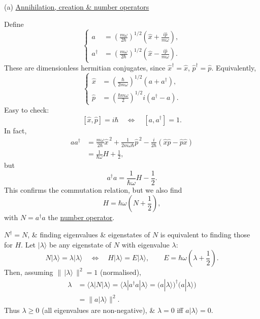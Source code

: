 \documentclass[11pt,a4paper]{article}
\begin{document}
\medskip

\noindent
(a) \underline{Annihilation, creation \& number operators}

Define
\[
    \left\{
    \begin{aligned}
        a&=\left(\frac{m\omega}{2\hbar}\right)^{1/2}
        \left(\hat{x}+\frac{i\hat{p}}{m\omega}\right),\\
        a^\dagger&=\left(\frac{m\omega}{2\hbar}\right)^{1/2}
        \left(\hat{x}-\frac{i\hat{p}}{m\omega}\right).
    \end{aligned}
    \right.
\]
These are dimensionless hermitian conjugates, since
$\hat{x}^\dagger=\hat{x}$, $\hat{p}^\dagger=\hat{p}$.
Equivalently,
\[
    \left\{
    \begin{aligned}
        \hat{x}&=\left(\frac{\hbar}{2m\omega}\right)^{1/2}
        (a+a^\dagger),\\
        \hat{p}&=\left(\frac{\hbar m\omega}{2}\right)^{1/2}
        i(a^\dagger-a).
    \end{aligned}
    \right.
\]
Easy to check:
\[
    [\hat{x},\hat{p}]=i\hbar
    \quad\Longleftrightarrow\quad
    [a,a^\dagger]=1.
\]
In fact,
\begin{align*}
    aa^\dagger
    &=\frac{m\omega}{2\hbar}\hat{x}^{\,2}
    +\frac{1}{2m\omega\hbar}\hat{p}^{\,2}
    -\frac{i}{2\hbar}(\hat{x}\hat{p}-\hat{p}\hat{x})\\
    &=\frac{1}{\hbar\omega}H+\frac{1}{2},
\end{align*}
but
\[
    a^\dagger a=\frac{1}{\hbar\omega}H-\frac{1}{2}.
\]
This confirms the commutation relation, but we also find
\[
    H=\hbar\omega\left(N+\frac{1}{2}\right),
\]
with $N=a^\dagger a$ the \underline{number operator}.

$N^\dagger=N$, \& finding eigenvalues \& eigenstates of $N$
is equivalent to finding those for $H$.
Let $|\lambda\rangle$ be any eigenstate of $N$ with eigenvalue $\lambda$:
\[
    N|\lambda\rangle=\lambda|\lambda\rangle
    \quad\Longleftrightarrow\quad
    H|\lambda\rangle=E|\lambda\rangle,
    \qquad
    E=\hbar\omega\left(\lambda+\frac{1}{2}\right).
\]
Then, assuming $\bigl\|\,|\lambda\rangle\,\bigr\|^2=1$
(normalised),
\begin{align*}
    \lambda
    &=\langle\lambda|N|\lambda\rangle
    =\langle\lambda|a^\dagger a|\lambda\rangle
    =\bigl(a|\lambda\rangle\bigr)^\dagger
    \bigl(a|\lambda\rangle\bigr)\\
    &=\bigl\|a|\lambda\rangle\bigr\|^2.
\end{align*}
Thus $\lambda\geq0$ (all eigenvalues are non-negative),
\& $\lambda=0$ iff $a|\lambda\rangle=0$.
\end{document}
